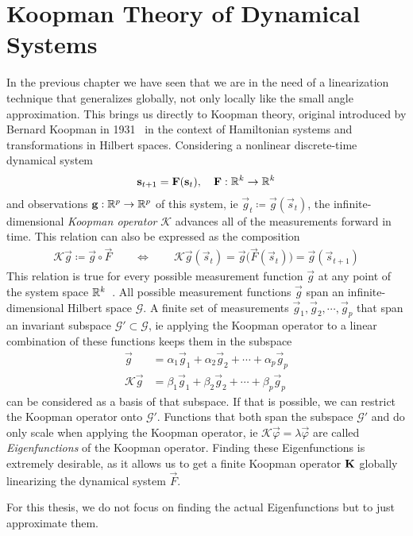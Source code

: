 \chapter{Koopman Theory of Dynamical Systems}
\label{c:koopmanTheoryOfDynamicalSystems}



In the previous chapter we have seen that we are in the need of a linearization technique that generalizes globally, not only locally like the small angle approximation. This brings us directly to Koopman theory, original introduced by Bernard Koopman in 1931~\cite{koopmanHamiltonianSystemsTransformation1931} in the context of Hamiltonian systems and transformations in Hilbert spaces. Considering a nonlinear discrete-time dynamical system
\begin{align*}
	\boldsymbol{\mathrm{s}}_{t + 1} = \boldsymbol{\mathrm{F}}(\boldsymbol{\mathrm{s}}_t),\quad \boldsymbol{\mathrm{F}} : \mathbb{R}^k \to \mathbb{R}^k
\end{align*}
and observations \( \boldsymbol{\mathrm{g}} : \mathbb{R}^p \to \mathbb{R}^p \) of this system, \ac{ie} \( \vec{g}_t \coloneqq \vec{g}(\vec{s}_t) \), the infinite-dimensional \emph{Koopman operator} \(\mathcal{K}\) advances all of the measurements forward in time. This relation can also be expressed as the composition
\begin{align*}
	\mathcal{K} \vec{g} \coloneqq \vec{g} \circ \vec{F} \qquad\iff\qquad \mathcal{K} \vec{g}(\vec{s}_t) = \vec{g}\big( \vec{F}(\vec{s}_t) \big) = \vec{g}(\vec{s}_{t + 1})
\end{align*}
This relation is true for every possible measurement function \( \vec{g} \) at any point of the system space \( \mathbb{R}^k \)~\cite{bruntonKoopmanInvariantSubspaces2016}. All possible measurement functions \( \vec{g} \) span an infinite-dimensional Hilbert space \( \mathcal{G} \). A finite set of measurements \( \vec{g}_1, \vec{g}_2, \cdots, \vec{g}_p \) that span an invariant subspace \( \mathcal{G}' \subset \mathcal{G} \), \ac{ie} applying the Koopman operator to a linear combination of these functions keeps them in the subspace
\begin{align*}
	\vec{g} &= \alpha_1 \vec{g}_1 + \alpha_2 \vec{g}_2 + \cdots + \alpha_p \vec{g}_p \\
	\mathcal{K} \vec{g} &= \beta_1 \vec{g}_1 + \beta_2 \vec{g}_2 + \cdots + \beta_p \vec{g}_p
\end{align*}
can be considered as a basis of that subspace. If that is possible, we can restrict the Koopman operator onto \( \mathcal{G}' \). Functions that both span the subspace \(\mathcal{G}'\) and do only scale when applying the Koopman operator, \ac{ie} \( \mathcal{K} \vec{\varphi} = \lambda \vec{\varphi} \) are called \emph{Eigenfunctions} of the Koopman operator. Finding these Eigenfunctions is extremely desirable, as it allows us to get a finite Koopman operator \( \boldsymbol{\mathrm{K}} \) globally linearizing the dynamical system \( \vec{F} \).

For this thesis, we do not focus on finding the actual Eigenfunctions but to just approximate them.
